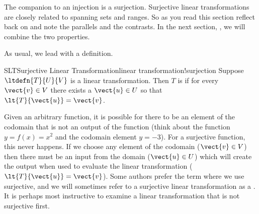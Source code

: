 %
The companion to an injection is a surjection.  Surjective linear transformations are closely related to spanning sets and ranges.  So as you read this section reflect back on  and note the parallels and the contrasts.  In the next section, , we will combine the two properties.\par
%
As usual, we lead with a definition.
%
\begin{definition}{SLT}{Surjective Linear Transformation}{linear transformation!surjection}
Suppose $\ltdefn{T}{U}{V}$ is a linear transformation.  Then $T$ is  if for every $\vect{v}\in V$ there exists a $\vect{u}\in U$ so that $\lt{T}{\vect{u}}=\vect{v}$.
\end{definition}
%
Given an arbitrary function, it is possible for there to be an element of the codomain that is not an output of the function (think about the function $y=f(x)=x^2$ and the codomain element $y=-3$).  For a surjective function, this never happens.  If we choose any element of the codomain ($\vect{v}\in V$) then there must be an input from the domain ($\vect{u}\in U$) which will create the output when used to evaluate the linear transformation ($\lt{T}{\vect{u}}=\vect{v}$).  Some authors prefer the term  where we use surjective, and we will sometimes refer to a surjective linear transformation as a .
%
%
It is perhaps most instructive to examine a linear transformation that is not surjective first.
%

